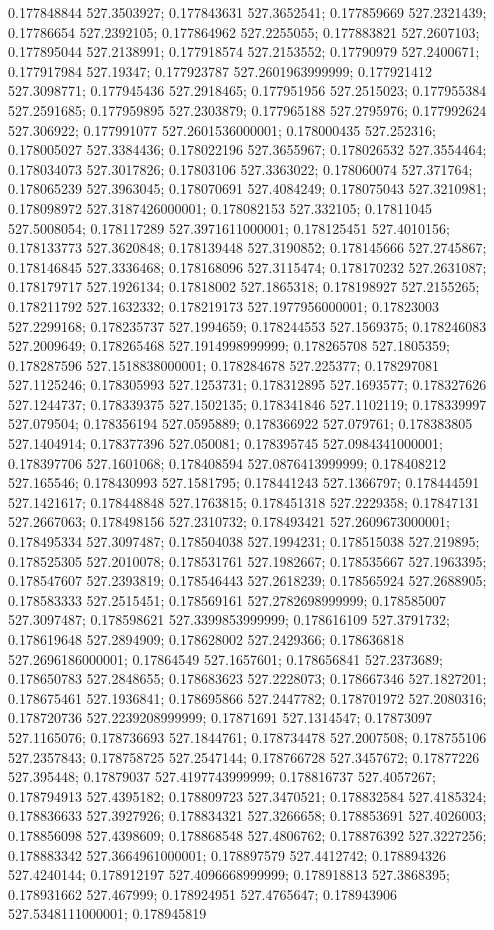 0.177848844 527.3503927; 0.177843631 527.3652541; 0.177859669 527.2321439; 0.17786654 527.2392105; 0.177864962 527.2255055; 0.177883821 527.2607103; 0.177895044 527.2138991; 0.177918574 527.2153552; 0.17790979 527.2400671; 0.177917984 527.19347; 0.177923787 527.2601963999999; 0.177921412 527.3098771; 0.177945436 527.2918465; 0.177951956 527.2515023; 0.177955384 527.2591685; 0.177959895 527.2303879; 0.177965188 527.2795976; 0.177992624 527.306922; 0.177991077 527.2601536000001; 0.178000435 527.252316; 0.178005027 527.3384436; 0.178022196 527.3655967; 0.178026532 527.3554464; 0.178034073 527.3017826; 0.17803106 527.3363022; 0.178060074 527.371764; 0.178065239 527.3963045; 0.178070691 527.4084249; 0.178075043 527.3210981; 0.178098972 527.3187426000001; 0.178082153 527.332105; 0.17811045 527.5008054; 0.178117289 527.3971611000001; 0.178125451 527.4010156; 0.178133773 527.3620848; 0.178139448 527.3190852; 0.178145666 527.2745867; 0.178146845 527.3336468; 0.178168096 527.3115474; 0.178170232 527.2631087; 0.178179717 527.1926134; 0.17818002 527.1865318; 0.178198927 527.2155265; 0.178211792 527.1632332; 0.178219173 527.1977956000001; 0.17823003 527.2299168; 0.178235737 527.1994659; 0.178244553 527.1569375; 0.178246083 527.2009649; 0.178265468 527.1914998999999; 0.178265708 527.1805359; 0.178287596 527.1518838000001; 0.178284678 527.225377; 0.178297081 527.1125246; 0.178305993 527.1253731; 0.178312895 527.1693577; 0.178327626 527.1244737; 0.178339375 527.1502135; 0.178341846 527.1102119; 0.178339997 527.079504; 0.178356194 527.0595889; 0.178366922 527.079761; 0.178383805 527.1404914; 0.178377396 527.050081; 0.178395745 527.0984341000001; 0.178397706 527.1601068; 0.178408594 527.0876413999999; 0.178408212 527.165546; 0.178430993 527.1581795; 0.178441243 527.1366797; 0.178444591 527.1421617; 0.178448848 527.1763815; 0.178451318 527.2229358; 0.17847131 527.2667063; 0.178498156 527.2310732; 0.178493421 527.2609673000001; 0.178495334 527.3097487; 0.178504038 527.1994231; 0.178515038 527.219895; 0.178525305 527.2010078; 0.178531761 527.1982667; 0.178535667 527.1963395; 0.178547607 527.2393819; 0.178546443 527.2618239; 0.178565924 527.2688905; 0.178583333 527.2515451; 0.178569161 527.2782698999999; 0.178585007 527.3097487; 0.178598621 527.3399853999999; 0.178616109 527.3791732; 0.178619648 527.2894909; 0.178628002 527.2429366; 0.178636818 527.2696186000001; 0.17864549 527.1657601; 0.178656841 527.2373689; 0.178650783 527.2848655; 0.178683623 527.2228073; 0.178667346 527.1827201; 0.178675461 527.1936841; 0.178695866 527.2447782; 0.178701972 527.2080316; 0.178720736 527.2239208999999; 0.17871691 527.1314547; 0.17873097 527.1165076; 0.178736693 527.1844761; 0.178734478 527.2007508; 0.178755106 527.2357843; 0.178758725 527.2547144; 0.178766728 527.3457672; 0.17877226 527.395448; 0.17879037 527.4197743999999; 0.178816737 527.4057267; 0.178794913 527.4395182; 0.178809723 527.3470521; 0.178832584 527.4185324; 0.178836633 527.3927926; 0.178834321 527.3266658; 0.178853691 527.4026003; 0.178856098 527.4398609; 0.178868548 527.4806762; 0.178876392 527.3227256; 0.178883342 527.3664961000001; 0.178897579 527.4412742; 0.178894326 527.4240144; 0.178912197 527.4096668999999; 0.178918813 527.3868395; 0.178931662 527.467999; 0.178924951 527.4765647; 0.178943906 527.5348111000001; 0.178945819 